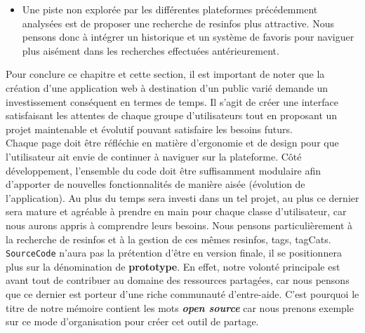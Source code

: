 \begin{itemize}
    \item Une piste non explorée par les différentes plateformes précédemment analysées est de proposer une recherche de \glspl{resinfo} plus attractive. Nous pensons donc à intégrer un historique et un système de favoris pour naviguer plus aisément dans les recherches effectuées antérieurement.
\end{itemize}

\pagebreak
Pour conclure ce chapitre et cette section, il est important de noter que la création d'une application web à destination d'un public varié demande un investissement conséquent en termes de temps. Il s'agit de créer une interface satisfaisant les attentes de chaque groupe d'utilisateurs tout en proposant un projet maintenable et évolutif pouvant satisfaire les besoins futurs.\\

Chaque page doit être réfléchie en matière d'ergonomie et de design pour que l'utilisateur ait envie de continuer à naviguer sur la plateforme. Côté développement, l'ensemble du code doit être suffisamment modulaire afin d'apporter de nouvelles fonctionnalités de manière aisée (évolution de l'application). Au plus du temps sera investi dans un tel projet, au plus ce dernier sera mature et agréable à prendre en main pour chaque classe d'utilisateur, car nous aurons appris à comprendre leurs besoins. Nous pensons particulièrement à la recherche de \glspl{resinfo} et à la gestion de ces mêmes \glspl{resinfo}, \glspl{tag}, \glspl{tagCat}.\\

\texttt{SourceCode} n'aura pas la prétention d'être en version finale, il se positionnera plus sur la dénomination de \textbf{prototype}. En effet, notre volonté principale est avant tout de contribuer au domaine des ressources partagées, car nous pensons que ce dernier est porteur d'une riche communauté d'entre-aide. C'est pourquoi le titre de notre mémoire contient les mots \textbf{\textit{open source}} car nous prenons exemple sur ce mode d'organisation pour créer cet outil de partage.
